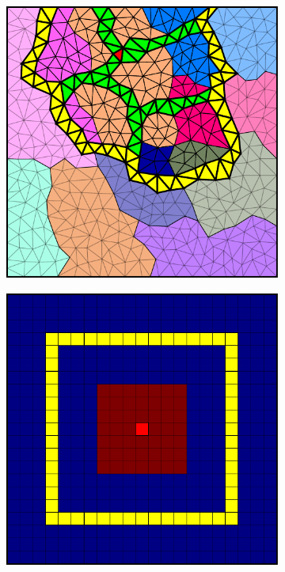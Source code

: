 \begin{figure}[htbp]
\begin{subfigure}[t]{0.3\textwidth}
  \end{subfigure}
  \hfill
  \begin{subfigure}[t]{0.3\textwidth}
    \centerline{\includegraphics[width=0.9\linewidth]{figs/square/square_tria_metis_cell_supp}}
  \end{subfigure}
  \par\bigskip
  \begin{subfigure}[t]{0.3\textwidth}
    \centerline{\includegraphics[width=0.9\linewidth]{figs/square/square_cart_struct_cell_init}}

\end{subfigure}
\end{figure}
